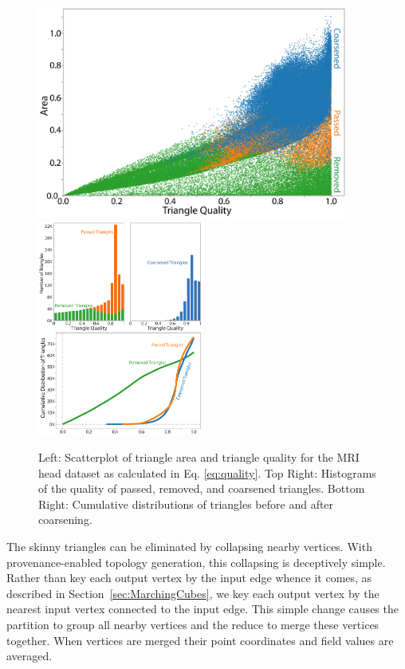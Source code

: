 \documentclass[10pt,journal,cspaper,compsoc]{IEEEtran}
\begin{document}
\begin{figure}[htb]
\begin{center}
\includegraphics[height=7.05cm]{ScatterAll.png}
\hspace{0.1cm}
\includegraphics[height=7.05cm]{MergedFigures.pdf}
\caption{Left: Scatterplot of triangle area and triangle quality for the MRI head dataset as calculated in Eq. \ref{eq:quality}.
Top Right: Histograms of the quality of passed, removed, and coarsened triangles.
Bottom Right: Cumulative distributions of triangles before and after coarsening.}
\label{fig:coarseninggraphs}
\end{center}
\end{figure}

The skinny triangles can be eliminated by collapsing nearby vertices.  With
provenance-enabled topology generation, this collapsing is deceptively
simple.  Rather than key each output vertex by the input edge whence it
comes, as described in Section~\ref{sec:MarchingCubes}, we key each output
vertex by the nearest input vertex connected to the input edge.  This
simple change causes the partition to group all nearby vertices and the
reduce to merge these vertices together.  When vertices are merged their
point coordinates and field values are averaged.
\end{document}
